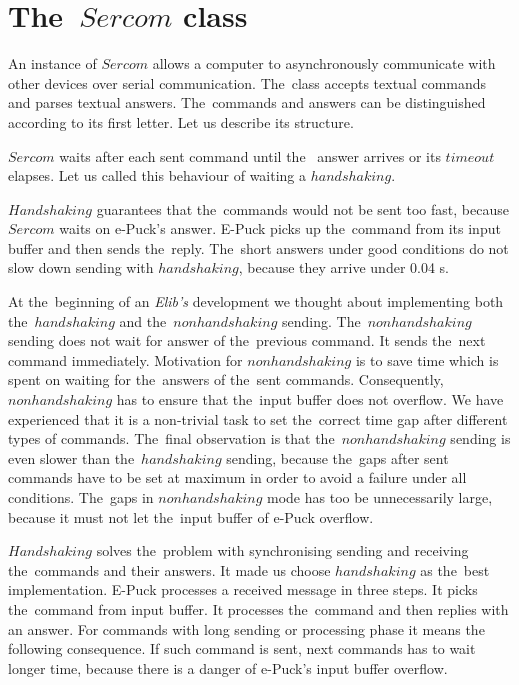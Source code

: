 \section{The~$Sercom$ class}\label{sec:sercom}
  An instance of $Sercom$ allows a computer to asynchronously communicate with other devices
  over serial communication. The~class accepts textual commands and parses textual answers.
  The~commands and answers can be distinguished according to its first letter.
  Let us describe its structure.
 
  \begin{definition}
  $Sercom$ waits after each sent command until the~ answer arrives or its $timeout$ elapses.
  Let us called this behaviour of waiting a $handshaking$.
  \end{definition}

  $Handshaking$ guarantees that the~commands would not be sent too fast,
  because $Sercom$ waits on e-Puck's answer. E-Puck picks up the~command from its input buffer and then sends the~reply.
  The~short answers under good conditions do not slow down sending with $handshaking$, because
  they arrive under 0.04 s. 


  At the~beginning of an {\it Elib's} development we thought about implementing both the~$handshaking$
  and the~$nonhandshaking$ sending.
  The~$nonhandshaking$ sending does not wait for answer of the~previous command. It sends the~next command immediately. 
  Motivation for $nonhandshaking$ is to save time which is spent on waiting for the~answers of the~sent commands.
  Consequently, $nonhandshaking$ has to ensure that the~input buffer does not overflow.
  We have experienced that it is a non-trivial task to set the~correct time gap after different types of commands. 
  The~final observation is that the~$nonhandshaking$ sending is even slower than the~$handshaking$ sending, 
  because the~gaps after sent commands have to be set at maximum in order to avoid a failure under all conditions. 
  The~gaps in $nonhandshaking$ mode has too be unnecessarily large, 
  because it must not let the~input buffer of e-Puck overflow.

  $Handshaking$ solves the~problem with synchronising sending and receiving the~commands and their answers. 
  It made us choose $handshaking$ as the~best implementation.
  E-Puck processes a received message in three steps. It picks the~command from input buffer.
  It processes the~command and then replies with an answer.
  For commands with long sending or processing phase it means the following consequence.
  If such command is sent, next commands has to wait longer time, because there is a
  danger of e-Puck's input buffer overflow.

